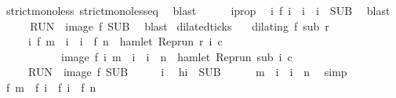 \begin{isabellebody}
\ strict{\isacharunderscore}mono{\isacharunderscore}less\ strict{\isacharunderscore}mono{\isacharunderscore}less{\isacharunderscore}eq\ \isamarkupfalse%
\ blast\isanewline
\ \ \ \ \isamarkupfalse%
\ i{}prop\ \isamarkupfalse%
\ {\isacartoucheopen}{\isasymexists}i\ f\ i\ {\isacharequal}\ i\ {\isasymand}\ i\ {\isasymin}\ {\isacharquery}SUB{\isacartoucheclose}\ \isamarkupfalse%
\ blast\isanewline
\ \ \isacommand{{\isacharbraceright}}\isamarkupfalse%
\ \isamarkupfalse%
\ {\isacartoucheopen}{\isacharquery}RUN\ {\isasymsubseteq}\ image\ f\ {\isacharquery}SUB{\isacartoucheclose}\ \isamarkupfalse%
\ blast\isanewline
{}\isamarkupfalse%
%
\endisatagproof
{\isafoldproof}%
%
\isadelimproof
\isanewline
%
\endisadelimproof
\isanewline
{}\isamarkupfalse%
\ dilated{\isacharunderscore}ticks{\isacharcolon}\isanewline
\ \ \ {\isacartoucheopen}dilating\ f\ sub\ r{\isacartoucheclose}\isanewline
\ \ \ \ \ {\isacartoucheopen}{\isacharbraceleft}i{\isachardot}\ f\ m\ {\isasymle}\ i\ {\isasymand}\ i\ {\isasymle}\ f\ n\ {\isasymand}\ hamlet\ {\isacharparenleft}{\isacharparenleft}Rep{\isacharunderscore}run\ r{\isacharparenright}\ i\ c{\isacharparenright}{\isacharbraceright}\isanewline
\ \ \ \ \ \ \ \ \ \ {\isacharequal}\ image\ f\ {\isacharbraceleft}i{\isachardot}\ m\ {\isasymle}\ i\ {\isasymand}\ i\ {\isasymle}\ n\ {\isasymand}\ hamlet\ {\isacharparenleft}{\isacharparenleft}Rep{\isacharunderscore}run\ sub{\isacharparenright}\ i\ c{\isacharparenright}{\isacharbraceright}{\isacartoucheclose}\isanewline
\ \ \ \ {\isacharparenleft}\ {\isacartoucheopen}{\isacharquery}RUN\ {\isacharequal}\ image\ f\ {\isacharquery}SUB{\isacartoucheclose}{\isacharparenright}\isanewline
%
\isadelimproof
%
\endisadelimproof
%
\isatagproof
{}\isamarkupfalse%
\isanewline
\ \ \isacommand{{\isacharbraceleft}}\isamarkupfalse%
\ \isamarkupfalse%
\ i\ \isamarkupfalse%
\ h{\isacharcolon}{\isacartoucheopen}i\ {\isasymin}\ {\isacharquery}SUB{\isacartoucheclose}\isanewline
\ \ \ \ \isamarkupfalse%
\ {\isacartoucheopen}m\ {\isasymle}\ i\ {\isasymand}\ i\ {\isasymle}\ n{\isacartoucheclose}\ \isamarkupfalse%
\ simp\isanewline
\ \ \ \ \isamarkupfalse%
\ {\isacartoucheopen}f\ m\ {\isasymle}\ f\ i\ {\isasymand}\ f\ i\ {\isasymle}\ {\isacharparenleft}f\ n{\isacharparenright}{\isacartoucheclose}\isanewline

\end{isabellebody}
